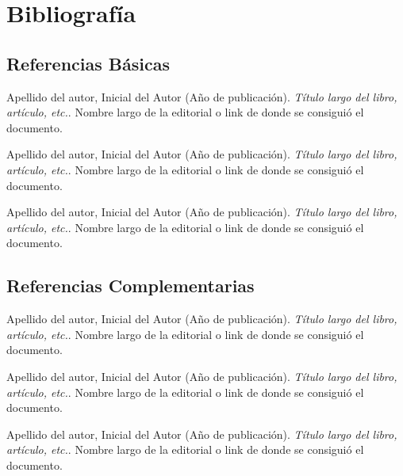 \section{Bibliografía}

\subsection*{Referencias Básicas}

\hangindent=1in
Apellido del autor, Inicial del Autor (Año de publicación). \textit{Título largo del libro, artículo, etc.}. Nombre largo de la editorial o link de donde se consiguió el documento.

\hangindent=1in
Apellido del autor, Inicial del Autor (Año de publicación). \textit{Título largo del libro, artículo, etc.}. Nombre largo de la editorial o link de donde se consiguió el documento.

\hangindent=1in
Apellido del autor, Inicial del Autor (Año de publicación). \textit{Título largo del libro, artículo, etc.}. Nombre largo de la editorial o link de donde se consiguió el documento.

\subsection*{Referencias Complementarias}

\hangindent=1in
Apellido del autor, Inicial del Autor (Año de publicación). \textit{Título largo del libro, artículo, etc.}. Nombre largo de la editorial o link de donde se consiguió el documento.

\hangindent=1in
Apellido del autor, Inicial del Autor (Año de publicación). \textit{Título largo del libro, artículo, etc.}. Nombre largo de la editorial o link de donde se consiguió el documento.

\hangindent=1in
Apellido del autor, Inicial del Autor (Año de publicación). \textit{Título largo del libro, artículo, etc.}. Nombre largo de la editorial o link de donde se consiguió el documento.
\pagebreak